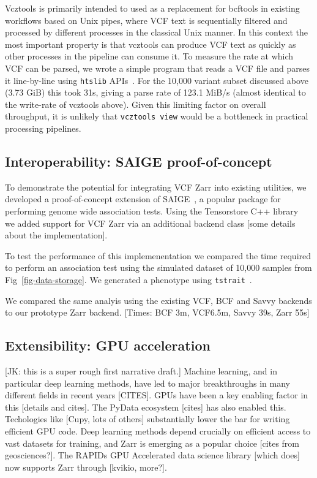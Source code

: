 \documentclass[a4paper,num-refs]{oup-contemporary}
\begin{document}
Vcztools is primarily intended to used as a replacement for bcftools 
in existing workflows based on Unix pipes, where VCF text is sequentially
filtered and processed by different processes in the classical
Unix manner. In this context the most important property is that vcztools
can produce VCF text as quickly as other processes in the pipeline can consume
it. To measure the rate at which VCF can be parsed, we wrote a simple
program that reads a VCF file and parses it line-by-line using \texttt{htslib}
APIs~\citep{bonfield2021htslib}. For the 10,000 variant subset discussed
above (3.73 GiB) this took 31s, giving a parse rate of 123.1 MiB/s
(almost identical to the write-rate of vcztools above). Given this limiting
factor on overall throughput,
it is unlikely that \texttt{vcztools view} would be a bottleneck 
in practical processing pipelines.

\subsection{Interoperability: SAIGE proof-of-concept}
To demonstrate the potential for integrating VCF Zarr into existing utilities,
we developed a proof-of-concept extension of SAIGE~\cite{zhou2018efficiently,
zhou2020scalable}, a popular package for performing genome wide
association tests. Using the Tensorstore C++ library~\cite{tensorstore}
we added support for VCF Zarr via an additional backend class [some details 
about the implementation].

To test the performance of this implemenentation we compared the time required
to perform an association test using the simulated dataset of 10,000 samples 
from Fig~\ref{fig-data-storage}. We generated a phenotype using
\texttt{tstrait}~\citep{tagami2024tstrait}.

We compared the same analyis using the existing VCF, BCF and Savvy backends
to our prototype Zarr backend. 
[Times: BCF 3m, VCF6.5m, Savvy 39s, Zarr 55s]






\subsection{Extensibility: GPU acceleration}
[JK: this is a super rough first narrative draft.]
Machine learning, and in particular deep learning methods, have led to 
major breakthroughs in many different fields in recent years [CITES].
GPUs have been a key enabling factor in this [details and cites].
The PyData ecosystem [cites] has also enabled this. Techologies like
[Cupy, lots of others] substantially lower the bar for writing efficient
GPU code.
Deep learning methods depend crucially on efficient access to vast 
datasets for training, and Zarr is emerging as a popular choice
[cites from geosciences?]. The RAPIDs GPU Accelerated data science 
library [which does] now supports Zarr through [kvikio, more?].
\end{document}
